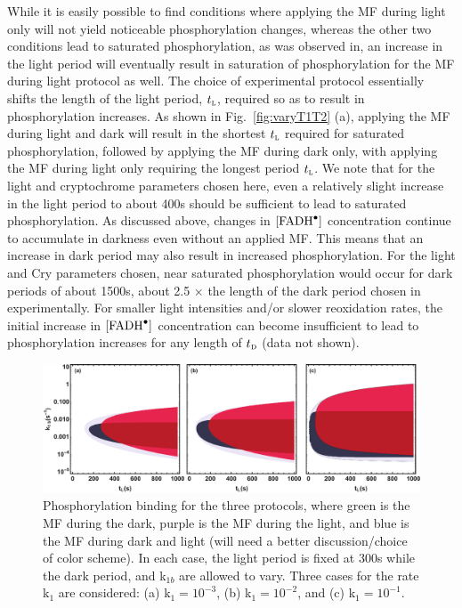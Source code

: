 \documentclass[twoside,twocolumn,9pt]{article}
\begin{document}
While it is easily possible to find conditions where applying the MF during light only will not yield noticeable phosphorylation
changes, whereas the other two conditions lead to saturated phosphorylation, as was observed in, \cite{Hammad2019} an increase in
the light period will eventually result in saturation of phosphorylation for the MF during light protocol as well. The choice of
experimental protocol essentially shifts the length of the light period, $t_{\textsc{l}}$, required so as to result in
phosphorylation increases. As shown in Fig.~\ref{fig:varyT1T2} (a), applying the MF during light and dark will result in the
shortest $t_{\textsc{l}}$ required for saturated phosphorylation, followed by applying the MF during dark only, with applying the MF
during light only requiring the longest period $t_{\textsc{l}}$. We note that for the light and cryptochrome parameters chosen here,
even a relatively slight increase in the light period to about 400s should be sufficient to lead to saturated phosphorylation. As
discussed above, changes in $[\ce{FADH^{.}}]$ concentration continue to accumulate in darkness even without an applied MF. This
means that an increase in dark period may also result in increased phosphorylation. For the light and Cry parameters chosen, near
saturated phosphorylation would occur for dark periods of about 1500s, about 2.5 $\times$ the length of the dark period chosen in
experimentally. \cite{Pooam2019, Hammad2019} For smaller light intensities and/or slower reoxidation rates, the initial increase in
$[\ce{FADH^{.}}]$ concentration can become insufficient to lead to phosphorylation increases for any length of $t_{\textsc{d}}$
(data not shown).
\begin{figure}[h]
	\centering
	\includegraphics[width = 2\columnwidth]{PhosK1bTL.pdf}
	\caption{Phosphorylation binding for the three protocols, where green is the MF during the dark, purple is the MF during the
		light, and blue is the MF during dark and light (will need a better discussion/choice of color scheme). In each case, the
		light period is fixed at 300s while the dark period, and k$_{1b}$ are allowed to vary. Three cases for the rate k$_{1}$ are
		considered: (a) k$_{1} = 10^{-3}$, (b) k$_{1} = 10^{-2}$, and (c) k$_{1} = 10^{-1}$.}
	\label{fig:PvsK1bTLight}
\end{figure}
\end{document}
